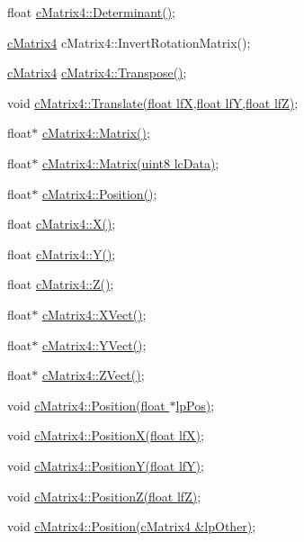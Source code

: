  float \hyperlink{classc_matrix4_a39cf7cefa0672684e69eb4af89366270}{cMatrix4::Determinant()}; \par
 \hyperlink{classc_matrix4}{cMatrix4} cMatrix4::InvertRotationMatrix(); \par
 \hyperlink{classc_matrix4}{cMatrix4} \hyperlink{classc_matrix4_ac8b6f1a9352943cd86ef4c088c438307}{cMatrix4::Transpose()}; \par
 void \hyperlink{classc_matrix4_af728db2d340a48de20d9f9e143e3a19b}{cMatrix4::Translate(float lfX,float lfY,float lfZ)}; \par
 \par
 float$\ast$ \hyperlink{classc_matrix4_a8697973a28e45b0866cce4cdba2e216d}{cMatrix4::Matrix()}; \par
 float$\ast$ \hyperlink{classc_matrix4_a1e70788aed256a22cf62b11a12e0db74}{cMatrix4::Matrix(uint8 lcData)}; \par
 float$\ast$ \hyperlink{classc_matrix4_a7b0917b0f0a69d73ed41d05fd37d52ac}{cMatrix4::Position()}; \par
 float \hyperlink{classc_matrix4_aff5d7d1cf3cf0b9ddb9e55e2f799012f}{cMatrix4::X()}; \par
 float \hyperlink{classc_matrix4_aa22f36646d19566a438a297cb9a9bfb5}{cMatrix4::Y()}; \par
 float \hyperlink{classc_matrix4_a8b62f500f8194b06dab12e85e57fd9ef}{cMatrix4::Z()}; \par
 float$\ast$ \hyperlink{classc_matrix4_a958689f28a118eac91104f5a847ac0fd}{cMatrix4::XVect()}; \par
 float$\ast$ \hyperlink{classc_matrix4_acff0242ac76b2ccd854eeec0d4913abe}{cMatrix4::YVect()}; \par
 float$\ast$ \hyperlink{classc_matrix4_ab3d5e1a9ca6652c84265d4d164494699}{cMatrix4::ZVect()}; \par
 \par
 void \hyperlink{classc_matrix4_ae3bb670db30cee45d59aef1599289086}{cMatrix4::Position(float $\ast$lpPos)}; \par
 void \hyperlink{classc_matrix4_adf27db7265e42ccbbb5a6779800c39ea}{cMatrix4::PositionX(float lfX)}; \par
 void \hyperlink{classc_matrix4_a4f7469486d7557e158ebc70a261c853c}{cMatrix4::PositionY(float lfY)}; \par
 void \hyperlink{classc_matrix4_a6baf253feb5e27b5e3e81971d9f5d718}{cMatrix4::PositionZ(float lfZ)}; \par
 void \hyperlink{classc_matrix4_a79457e17d6ab9a0c5db16c94405be35c}{cMatrix4::Position(cMatrix4 \&lpOther)}; \par
